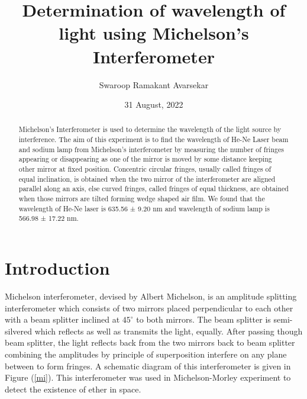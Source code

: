 \documentclass[a4paper, amsfonts, amssymb, amsmath, reprint, showkeys, nofootinbib, twoside]{revtex4-1}
\begin{document}
\title{Determination of wavelength of light using Michelson's Interferometer}
\author{Swaroop Ramakant Avarsekar}
\date{31 August, 2022}


	
\begin{abstract}
Michelson's Interferometer is used to determine the wavelength of the light source by interference. The aim of this experiment is to find the wavelength of He-Ne Laser beam and sodium lamp from Michelson's interferometer by measuring the number of fringes appearing or disappearing as one of the mirror is moved by some distance keeping other mirror at fixed position. Concentric circular fringes, usually called fringes of equal inclination, is obtained when the two mirror of the interferometer are aligned parallel along an axis, else curved fringes, called fringes of equal thickness, are obtained when those mirrors are tilted forming wedge shaped air film. We found that the wavelength of He-Ne laser is 635.56 ± 9.20 nm and wavelength of sodium lamp is 566.98 ± 17.22 nm.
\end{abstract}
	
	
\maketitle

\section{Introduction}

Michelson interferometer, devised by Albert Michelson, is an amplitude splitting interferometer which consists of two mirrors placed perpendicular to each other with a beam splitter inclined at $45^{\circ}$ to both mirrors. The beam splitter is semi-silvered which reflects as well as transmits the light, equally. After passing though beam splitter, the light reflects back from the two mirrors back to beam splitter combining the amplitudes by principle of superposition interfere on any plane between to form fringes. A schematic diagram of this interferometer is given in Figure (\ref{mi}). This interferometer was used in Michelson-Morley experiment to detect the existence of ether in space. 
\end{document}

